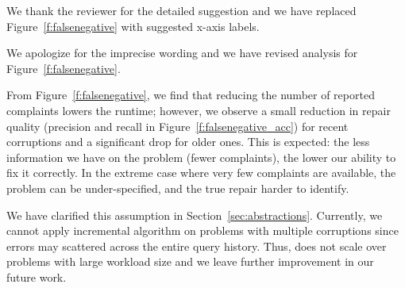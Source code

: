 \begin{quote}
\end{quote}

We thank the reviewer for the detailed suggestion and we have replaced Figure~\ref{f:falsenegative} with suggested x-axis labels. 

\begin{quote}
\end{quote}

We apologize for the imprecise wording and we have revised analysis for Figure~\ref{f:falsenegative}.

From Figure~\ref{f:falsenegative}, we find that reducing the number of reported complaints lowers the
runtime; however, we observe a small reduction in repair quality (precision
and recall in Figure~\ref{f:falsenegative_acc}) for recent corruptions and a
significant drop for older ones. This is expected: the less information we
have on the problem (fewer complaints), the lower our ability to fix it
correctly. In the extreme case where very few complaints are available, the
problem can be under-specified, and the true repair harder to identify.

\begin{quote}
\end{quote}

We have clarified this assumption in Section~\ref{sec:abstractions}. Currently, 
we cannot apply incremental algorithm 
on problems with multiple corruptions since errors may scattered across the entire query history.
Thus, \sys does not scale over problems with large workload size and we leave further improvement in our future work.


